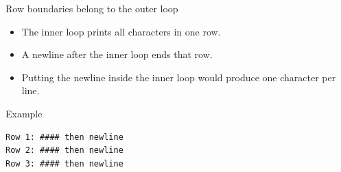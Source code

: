 \documentclass[10pt,aspectratio=169]{beamer}
\begin{document}
\begin{frame}[fragile,t]{Row boundaries belong to the outer loop}
\begin{itemize}
\item The inner loop prints all characters in one row.
\item A newline after the inner loop ends that row.
\item Putting the newline inside the inner loop would produce one character per line.
\end{itemize}
\vspace{1mm}\begin{block}{Example}
\begin{lstlisting}
Row 1: #### then newline
Row 2: #### then newline
Row 3: #### then newline
\end{lstlisting}
\end{block}
\end{frame}
\end{document}
